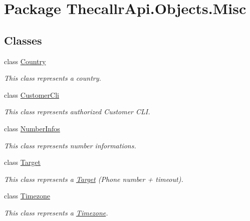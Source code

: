 \hypertarget{namespace_thecallr_api_1_1_objects_1_1_misc}{\section{Package Thecallr\+Api.\+Objects.\+Misc}
\label{namespace_thecallr_api_1_1_objects_1_1_misc}
}
\subsection*{Classes}
\begin{DoxyCompactItemize}
\item 
class \hyperlink{class_thecallr_api_1_1_objects_1_1_misc_1_1_country}{Country}
\begin{DoxyCompactList}\small\item\em This class represents a country. \end{DoxyCompactList}\item 
class \hyperlink{class_thecallr_api_1_1_objects_1_1_misc_1_1_customer_cli}{Customer\+Cli}
\begin{DoxyCompactList}\small\item\em This class represents authorized Customer C\+L\+I. \end{DoxyCompactList}\item 
class \hyperlink{class_thecallr_api_1_1_objects_1_1_misc_1_1_number_infos}{Number\+Infos}
\begin{DoxyCompactList}\small\item\em This class represents number informations. \end{DoxyCompactList}\item 
class \hyperlink{class_thecallr_api_1_1_objects_1_1_misc_1_1_target}{Target}
\begin{DoxyCompactList}\small\item\em This class represents a \hyperlink{class_thecallr_api_1_1_objects_1_1_misc_1_1_target}{Target} (Phone number + timeout). \end{DoxyCompactList}\item 
class \hyperlink{class_thecallr_api_1_1_objects_1_1_misc_1_1_timezone}{Timezone}
\begin{DoxyCompactList}\small\item\em This class represents a \hyperlink{class_thecallr_api_1_1_objects_1_1_misc_1_1_timezone}{Timezone}. \end{DoxyCompactList}\end{DoxyCompactItemize}
